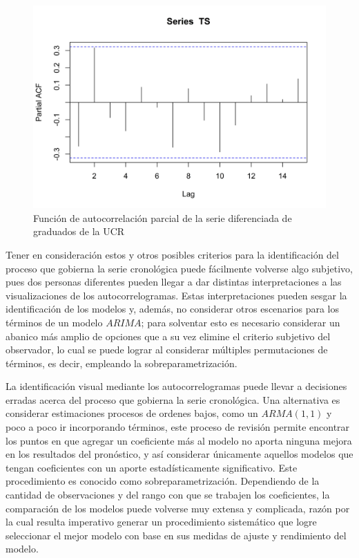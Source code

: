\documentclass[
]{article}
\begin{document}
\begin{figure}[!h]
\includegraphics[width=1\linewidth,height=1\textheight]{Tesis_files/figure-latex/parcial_ucr2-1} \caption{Función de autocorrelación parcial de la serie diferenciada de graduados de la UCR}\label{fig:parcial_ucr2}
\end{figure}

Tener en consideración estos y otros posibles criterios para la
identificación del proceso que gobierna la serie cronológica puede
fácilmente volverse algo subjetivo, pues dos personas diferentes pueden
llegar a dar distintas interpretaciones a las visualizaciones de los
autocorrelogramas. Estas interpretaciones pueden sesgar la
identificación de los modelos y, además, no considerar otros escenarios
para los términos de un modelo \(ARIMA\); para solventar esto es
necesario considerar un abanico más amplio de opciones que a su vez
elimine el criterio subjetivo del observador, lo cual se puede lograr al
considerar múltiples permutaciones de términos, es decir, empleando la
sobreparametrización.

La identificación visual mediante los autocorrelogramas puede llevar a
decisiones erradas acerca del proceso que gobierna la serie cronológica.
Una alternativa es considerar estimaciones procesos de ordenes bajos,
como un \(ARMA(1,1)\) y poco a poco ir incorporando términos, este
proceso de revisión permite encontrar los puntos en que agregar un
coeficiente más al modelo no aporta ninguna mejora en los resultados del
pronóstico, y así considerar únicamente aquellos modelos que tengan
coeficientes con un aporte estadísticamente significativo. Este
procedimiento es conocido como sobreparametrización. Dependiendo de la
cantidad de observaciones y del rango con que se trabajen los
coeficientes, la comparación de los modelos puede volverse muy extensa y
complicada, razón por la cual resulta imperativo generar un
procedimiento sistemático que logre seleccionar el mejor modelo con base
en sus medidas de ajuste y rendimiento del modelo.
\end{document}

